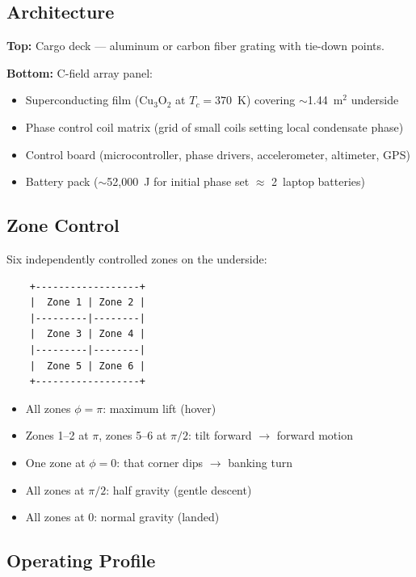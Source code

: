 \documentclass[11pt, a4paper]{article}
\begin{document}
\subsection{Architecture}

\textbf{Top:} Cargo deck --- aluminum or carbon fiber grating
with tie-down points.

\textbf{Bottom:} C-field array panel:
\begin{itemize}[nosep]
  \item Superconducting film (Cu$_3$O$_2$ at $T_c = 370$~K)
        covering $\sim$1.44~m$^2$ underside
  \item Phase control coil matrix (grid of small coils
        setting local condensate phase)
  \item Control board (microcontroller, phase drivers,
        accelerometer, altimeter, GPS)
  \item Battery pack ($\sim$52{,}000~J for initial phase set
        $\approx$ 2~laptop batteries)
\end{itemize}

\subsection{Zone Control}

Six independently controlled zones on the underside:

\begin{verbatim}
    +------------------+
    |  Zone 1 | Zone 2 |
    |---------|--------|
    |  Zone 3 | Zone 4 |
    |---------|--------|
    |  Zone 5 | Zone 6 |
    +------------------+
\end{verbatim}

\begin{itemize}[nosep]
  \item All zones $\phi = \pi$: maximum lift (hover)
  \item Zones 1--2 at $\pi$, zones 5--6 at $\pi/2$: tilt
        forward $\to$ forward motion
  \item One zone at $\phi = 0$: that corner dips $\to$ banking
        turn
  \item All zones at $\pi/2$: half gravity (gentle descent)
  \item All zones at $0$: normal gravity (landed)
\end{itemize}

\subsection{Operating Profile}
\end{document}
